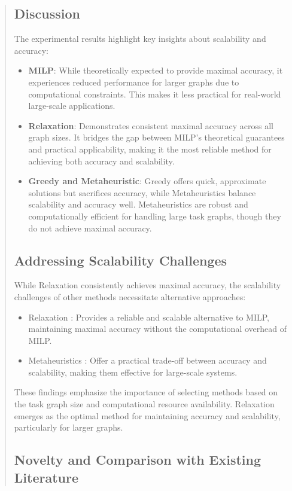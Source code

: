 \documentclass[conference]{IEEEtran}
\begin{document}
\begin{abstract}
\subsection{Discussion}

The experimental results highlight key insights about scalability and accuracy:
\begin{itemize}
\item \textbf{MILP}: While theoretically expected to provide maximal accuracy, it experiences reduced performance for larger graphs due to computational constraints. This makes it less practical for real-world large-scale applications.
\item \textbf{Relaxation}: Demonstrates consistent maximal accuracy across all graph sizes. It bridges the gap between MILP’s theoretical guarantees and practical applicability, making it the most reliable method for achieving both accuracy and scalability.
\item \textbf{Greedy and Metaheuristic}: Greedy offers quick, approximate solutions but sacrifices accuracy, while Metaheuristics balance scalability and accuracy well. Metaheuristics are robust and computationally efficient for handling large task graphs, though they do not achieve maximal accuracy.
\end{itemize}

\subsection{Addressing Scalability Challenges}

While Relaxation consistently achieves maximal accuracy, the scalability challenges of other methods necessitate alternative approaches:
\begin{itemize}
\item Relaxation : Provides a reliable and scalable alternative to MILP, maintaining maximal accuracy without the computational overhead of MILP.
\item Metaheuristics : Offer a practical trade-off between accuracy and scalability, making them effective for large-scale systems.
\end{itemize}

These findings emphasize the importance of selecting methods based on the task graph size and computational resource availability. Relaxation emerges as the optimal method for maintaining accuracy and scalability, particularly for larger graphs.

\subsection{Novelty and Comparison with Existing Literature}


\end{abstract}
\end{document}
